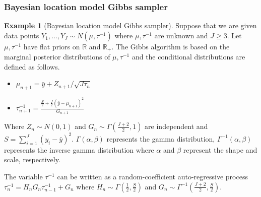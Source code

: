 \documentclass[12pt]{article}
\theoremstyle{plain}%
\theoremstyle{definition}
\newtheorem{example}{Example}[section]
\def\tin{\tau^{-1}}
\def\tinv{\tau^{-1}}
\begin{document}
\subsubsection{Bayesian location model Gibbs sampler}
\begin{example}[Bayesian location model Gibbs sampler]\label{ex:locmodel}
	Suppose that we are given data points $Y_1,\ldots, Y_J \sim N(\mu, \tau^{-1})$ where $\mu, \tau^{-1}$ are unknown and $J\geq 3$. Let $\mu, \tau^{-1}$ have flat priors on $\mathbb{R}$ and $\mathbb{R}_+$. The Gibbs algorithm is based on the marginal posterior distributions of $\mu, \tin$ and the conditional distributions are defined as follows.
	
	\begin{itemize}
		\item $\mu_{n+1} = \bar{y} + Z_{n+1}/\sqrt{J \tau_{n}}$
		\item $\tau^{-1}_{n+1} = \frac{\frac{S}{2}+\frac{J}{2}(\bar{y}-\mu_{n+1})^2}{G_{n+1}}$
	\end{itemize}
	Where $Z_{n}\sim N(0,1)$ and $G_{n}\sim \Gamma(\frac{J+2}{2},1)$ are independent and $S=\sum_{i=1}^J (y_i-\bar{y})^2$. $\Gamma(\alpha, \beta)$ represents the gamma distribution, $\Gamma^{-1}(\alpha, \beta)$ represents the inverse gamma distribution where $\alpha$ and $\beta$ represent the shape and scale, respectively.
	
	The variable $\tau^{-1}$ can be written as a random-coefficient auto-regressive process $\tinv_{n}=H_nG_n\tinv_{n-1}+G_n$
	where $H_n\sim \Gamma\left(\frac{1}{2}, \frac{S}{2}\right)$ and $G_n\sim \Gamma^{-1}\left(\frac{J+2}{2}, \frac{S}{2}\right)$.
\end{example}
\end{document}
